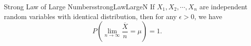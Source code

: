 \documentclass[math]{amznotes}
\theoremstyle{remark}
\begin{document}
\begin{thmbox}{Strong Law of Large Numbers}{strongLawLargeN}
    If $X_1, X_2, \cdots, X_n$ are independent random variables with identical distribution, then for any $\epsilon > 0$, we have
    \begin{equation*}
        P\left(\lim_{n \to \infty}\frac{\overline{X}}{n} = \mu\right) = 1.
    \end{equation*}
\end{thmbox}
\end{document}
